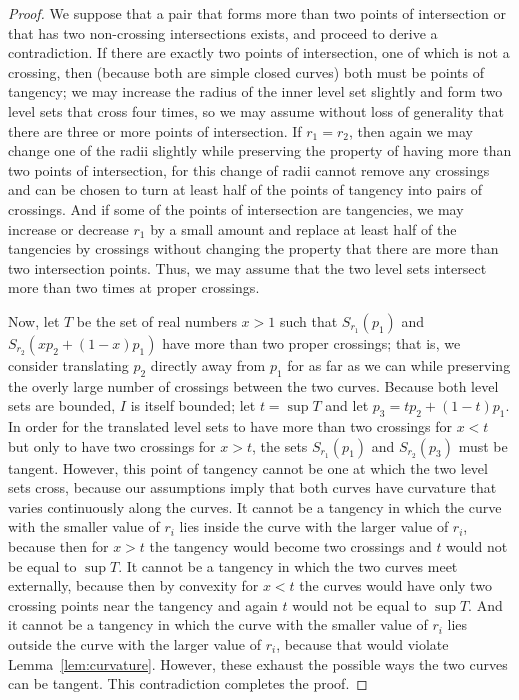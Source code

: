 \documentclass[10pt, conference, compsocconf]{IEEEtran}
\begin{document}
\begin{proof}
We suppose that a pair that forms more than two points of intersection or that has two non-crossing intersections exists, and proceed to derive a contradiction. If there are exactly two points of intersection, one of which is not a crossing, then (because both are simple closed curves) both must be points of tangency; we may increase the radius of the inner level set slightly and form two level sets that cross four times, so we may assume without loss of generality that there are three or more points of intersection. If $r_1=r_2$, then again we may change one of the radii slightly while preserving the property of having more than two points of intersection, for this change of radii cannot remove any crossings and can be chosen to turn at least half of the points of tangency into pairs of crossings.
And if some of the points of intersection are tangencies, we may increase or decrease $r_1$ by a small amount and replace at least half of the tangencies by crossings without changing the property that there are more than two intersection points. Thus, we may assume that the two level sets intersect more than two times at proper crossings.

Now, let $T$ be the set of real numbers $x>1$ such that $S_{r_1}(p_1)$ and $S_{r_2}(xp_2+(1-x)p_1)$ have more than two proper crossings; that is, we consider translating $p_2$ directly away from $p_1$ for as far as we can while preserving the overly large number of crossings between the two curves. Because both level sets are bounded, $I$ is itself bounded; let $t=\sup T$ and let $p_3=tp_2+(1-t)p_1$.
In order for the translated level sets to have more than two crossings for $x<t$ but only to have two crossings for $x>t$, the sets $S_{r_1}(p_1)$ and $S_{r_2}(p_3)$ must be tangent. However, this point of tangency cannot be one at which the two level sets cross, because our assumptions imply that both curves have curvature that varies continuously along the curves. It cannot be a tangency in which the curve with the smaller value of $r_i$ lies inside the curve with the larger value of $r_i$, because then for $x>t$ the tangency would become two crossings and $t$ would not be equal to $\sup T$. It cannot be a tangency in which the two curves meet externally, because then by convexity for $x<t$ the curves would have only two crossing points near the tangency and again $t$ would not be equal to $\sup T$. And it cannot be a tangency in which the curve with the smaller value of $r_i$ lies outside the curve with the larger value of $r_i$, because that would violate Lemma~\ref{lem:curvature}. However, these exhaust the possible ways the two curves can be tangent. This contradiction completes the proof.
\end{proof}
\end{document}
